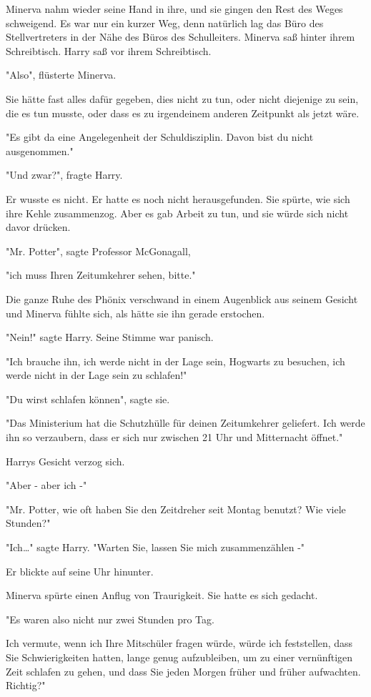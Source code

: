 {Minerva nahm wieder seine Hand in ihre, und sie gingen den Rest des Weges schweigend. Es war nur ein kurzer Weg, denn natürlich lag das Büro des Stellvertreters in der Nähe des Büros des Schulleiters. Minerva saß hinter ihrem Schreibtisch. Harry saß vor ihrem Schreibtisch.

"Also", flüsterte Minerva.

Sie hätte fast alles dafür gegeben, dies nicht zu tun, oder nicht diejenige zu sein, die es tun musste, oder dass es zu irgendeinem anderen Zeitpunkt als jetzt wäre.

"Es gibt da eine Angelegenheit der Schuldisziplin. Davon bist du nicht ausgenommen."

"Und zwar?", fragte Harry.

Er wusste es nicht. Er hatte es noch nicht herausgefunden. Sie spürte, wie sich ihre Kehle zusammenzog. Aber es gab Arbeit zu tun, und sie würde sich nicht davor drücken.

"Mr. Potter", sagte Professor McGonagall,

"ich muss Ihren Zeitumkehrer sehen, bitte."

Die ganze Ruhe des Phönix verschwand in einem Augenblick aus seinem Gesicht und Minerva fühlte sich, als hätte sie ihn gerade erstochen.

"Nein!" sagte Harry. Seine Stimme war panisch.

"Ich brauche ihn, ich werde nicht in der Lage sein, Hogwarts zu besuchen, ich werde nicht in der Lage sein zu schlafen!"

"Du wirst schlafen können", sagte sie.

"Das Ministerium hat die Schutzhülle für deinen Zeitumkehrer geliefert. Ich werde ihn so verzaubern, dass er sich nur zwischen 21 Uhr und Mitternacht öffnet."

Harrys Gesicht verzog sich.

"Aber - aber ich -"

"Mr. Potter, wie oft haben Sie den Zeitdreher seit Montag benutzt? Wie viele Stunden?"

"Ich…" sagte Harry. "Warten Sie, lassen Sie mich zusammenzählen -"

Er blickte auf seine Uhr hinunter.

Minerva spürte einen Anflug von Traurigkeit. Sie hatte es sich gedacht.

"Es waren also nicht nur zwei Stunden pro Tag.

Ich vermute, wenn ich Ihre Mitschüler fragen würde, würde ich feststellen, dass Sie Schwierigkeiten hatten, lange genug aufzubleiben, um zu einer vernünftigen Zeit schlafen zu gehen, und dass Sie jeden Morgen früher und früher aufwachten. Richtig?"

}
